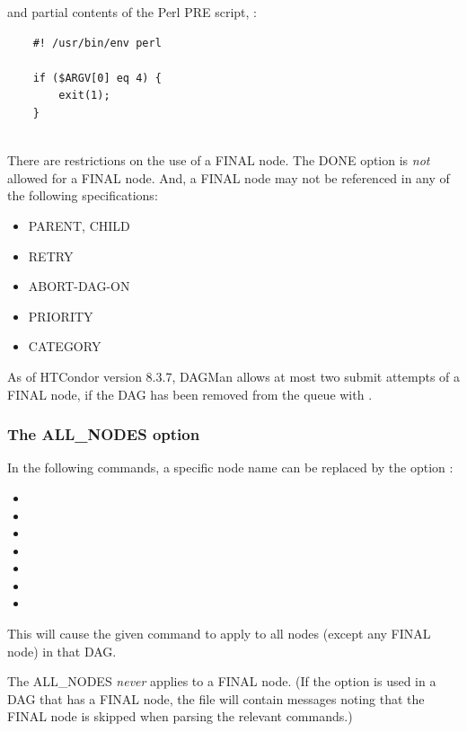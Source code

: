 and partial contents of the Perl PRE script, :
\begin{verbatim}
    #! /usr/bin/env perl
    
    if ($ARGV[0] eq 4) {
        exit(1);
    }
   
\end{verbatim}


There are restrictions on the use of a FINAL node.
The DONE option is \emph{not} allowed for a FINAL node.
And, a FINAL node may not be referenced in any of the following
specifications:
\begin{itemize}
\item PARENT, CHILD
\item RETRY
\item ABORT-DAG-ON
\item PRIORITY
\item CATEGORY
\end{itemize}

As of HTCondor version 8.3.7, DAGMan allows at most two submit attempts
of a FINAL node,
if the DAG has been removed from the queue with .

\subsubsection{\label{sec:DAGAllNodes}The ALL\_NODES option}

In the following commands, a specific node name can be replaced by
the option :
\begin{itemize}
\item {}
\item {}
\item {}
\item {}
\item {}
\item {}
\item {}
\end{itemize}

This will cause the given command to apply to all nodes (except any
FINAL node) in that DAG.

The ALL\_NODES \emph{never} applies to a FINAL node.  (If the
 option is used in a DAG that has a FINAL node, the
 file will contain messages noting that the FINAL
node is skipped when parsing the relevant commands.)

